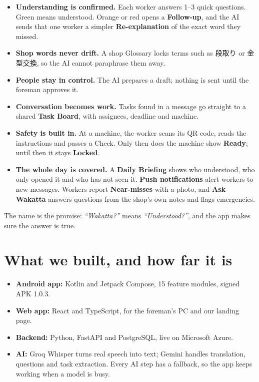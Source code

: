 \documentclass[11pt,a4paper]{article}
\begin{document}
\begin{itemize}
  \item \textbf{Understanding is confirmed.} Each worker answers 1--3 quick questions. Green means understood. Orange or red opens a \textbf{Follow-up}, and the AI sends that one worker a simpler \textbf{Re-explanation} of the exact word they missed.
  \item \textbf{Shop words never drift.} A shop Glossary locks terms such as 段取り or 金型交換, so the AI cannot paraphrase them away.
  \item \textbf{People stay in control.} The AI prepares a draft; nothing is sent until the foreman approves it.
  \item \textbf{Conversation becomes work.} Tasks found in a message go straight to a shared \textbf{Task Board}, with assignees, deadline and machine.
  \item \textbf{Safety is built in.} At a machine, the worker scans its QR code, reads the instructions and passes a Check. Only then does the machine show \textbf{Ready}; until then it stays \textbf{Locked}.
  \item \textbf{The whole day is covered.} A \textbf{Daily Briefing} shows who understood, who only opened it and who has not seen it. \textbf{Push notifications} alert workers to new messages. Workers report \textbf{Near-misses} with a photo, and \textbf{Ask Wakatta} answers questions from the shop's own notes and flags emergencies.
\end{itemize}

The name is the promise: \textit{``Wakatta?''} means \textit{``Understood?''}, and the app makes sure the answer is true.

\section{What we built, and how far it is}

\begin{itemize}
  \item \textbf{Android app:} Kotlin and Jetpack Compose, 15 feature modules, signed APK 1.0.3.
  \item \textbf{Web app:} React and TypeScript, for the foreman's PC and our landing page.
  \item \textbf{Backend:} Python, FastAPI and PostgreSQL, live on Microsoft Azure.
  \item \textbf{AI:} Groq Whisper turns real speech into text; Gemini handles translation, questions and task extraction. Every AI step has a fallback, so the app keeps working when a model is busy.
\end{itemize}
\end{document}

